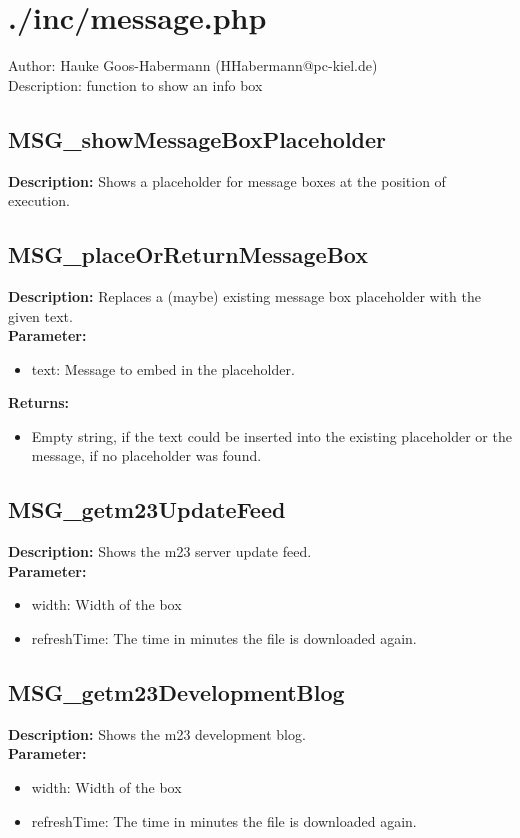 \newpage\section{./inc/message.php}
 Author: Hauke Goos-Habermann (HHabermann@pc-kiel.de)\\
 Description: function to show an info box\\

\subsection{MSG\_showMessageBoxPlaceholder}
\textbf{Description:} Shows a placeholder for message boxes at the position of execution.\\

\subsection{MSG\_placeOrReturnMessageBox}
\textbf{Description:} Replaces a (maybe) existing message box placeholder with the given text.\\
\textbf{Parameter:}
\begin{itemize}
\item text: Message to embed in the placeholder.
\end{itemize}
\textbf{Returns:}
\begin{itemize}
\item Empty string, if the text could be inserted into the existing placeholder or the message, if no placeholder was found.
\end{itemize}

\subsection{MSG\_getm23UpdateFeed}
\textbf{Description:} Shows the m23 server update feed.\\
\textbf{Parameter:}
\begin{itemize}
\item width: Width of the box
\item refreshTime: The time in minutes the file is downloaded again.
\end{itemize}

\subsection{MSG\_getm23DevelopmentBlog}
\textbf{Description:} Shows the m23 development blog.\\
\textbf{Parameter:}
\begin{itemize}
\item width: Width of the box
\item refreshTime: The time in minutes the file is downloaded again.
\end{itemize}

